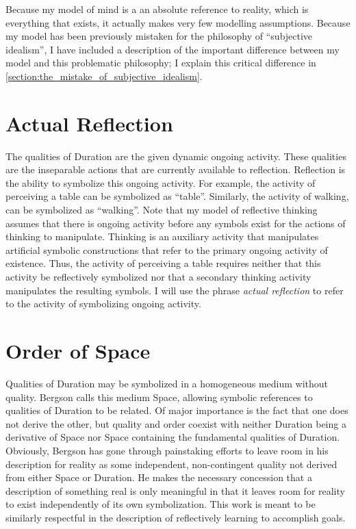 Because my model of mind is a an absolute reference to reality, which
is everything that exists, it actually makes very few modelling
assumptions.  Because my model has been previously mistaken for the
philosophy of ``subjective idealism'', I have included a description
of the important difference between my model and this problematic
philosophy; I explain this critical difference in
\autoref{section:the_mistake_of_subjective_idealism}.

\section{Actual Reflection}

The qualities of Duration are the given dynamic ongoing activity.
These qualities are the inseparable actions that are currently
available to reflection.  Reflection is the ability to symbolize this
ongoing activity.  For example, the activity of perceiving a table can
be symbolized as ``table''.  Similarly, the activity of walking, can
be symbolized as ``walking''.  Note that my model of reflective
thinking assumes that there is ongoing activity before any symbols
exist for the actions of thinking to manipulate.  Thinking is an
auxiliary activity that manipulates artificial symbolic constructions
that refer to the primary ongoing activity of existence.  Thus, the
activity of perceiving a table requires neither that this activity be
reflectively symbolized nor that a secondary thinking activity
manipulates the resulting symbols.  I will use the phrase \emph{actual
  reflection} to refer to the activity of symbolizing ongoing
activity.

\section{Order of Space}

Qualities of Duration may be symbolized in a homogeneous medium
without quality.  Bergson calls this medium Space, allowing symbolic
references to qualities of Duration to be related.  Of major
importance is the fact that one does not derive the other, but quality
and order coexist with neither Duration being a derivative of Space
nor Space containing the fundamental qualities of Duration.
Obviously, Bergson has gone through painstaking efforts to leave room
in his description for reality as some independent, non-contingent
quality not derived from either Space or Duration.  He makes the
necessary concession that a description of something real is only
meaningful in that it leaves room for reality to exist independently
of its own symbolization.  This work is meant to be similarly
respectful in the description of reflectively learning to accomplish
goals.

